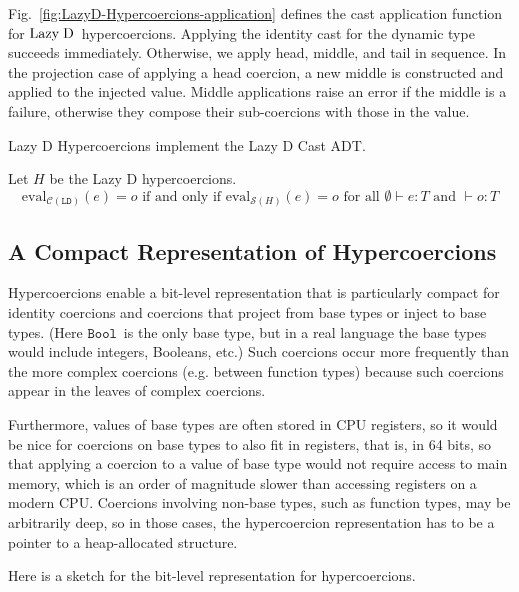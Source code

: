 \documentclass[runningheads]{llncs}
\newcommand{\LD}{\ensuremath{\text{Lazy\;D}}}
\newcommand{\CMachine}[1]{\ensuremath{\mathcal{C}(#1)}}
\newcommand{\LDMachine}{\CMachine{\BLD}}
\newcommand{\SMachine}[1]{\ensuremath{\mathcal{S}(#1)}}
\newcommand{\Pbool}[0]{\ensuremath{\mathtt{Bool}}}
\newcommand{\BLD}[0]{\ensuremath{\mathtt{LD}}}
\newcommand{\expressiontyping}[3]{\ensuremath{#1 \vdash #2 : #3}}
\newcommand{\valuetyping}[2]{\ensuremath{\vdash #1 : #2}}
\newcommand{\withmachineevalto}[3]{\ensuremath{\mathrm{eval}_{#1}(#2)=#3}}
\newcommand{\machineequiv}[2]{
	\ensuremath{
		\withmachineevalto{#1}{e}{o}	
		\text{ if and only if }
		\withmachineevalto{#2}{e}{o}
		\text{ for all }
		\expressiontyping{\emptyset}{e}{T}
		\text{ and }
		\valuetyping{o}{T}
	}}
\begin{document}
Fig.~\ref{fig:LazyD-Hypercoercions-application} defines the cast application 
function for \LD\ hypercoercions.
Applying the identity cast for the dynamic type succeeds immediately. 
Otherwise, we apply head, middle, and tail in sequence. 
%
In the projection case of applying a head coercion, a new middle is
constructed and applied to the injected value.
%
Middle applications raise an error if the middle is a failure,
otherwise they compose their sub-coercions with those in the value.

\begin{proposition} Lazy D Hypercoercions implement the Lazy D Cast ADT.
\end{proposition}
\begin{theorem} Let $H$ be the Lazy D 
hypercoercions.
\[\machineequiv{\LDMachine}{\SMachine{H}}\]
\end{theorem}


\subsection{A Compact Representation of Hypercoercions} \label{sec:hypercoercions-compact}

Hypercoercions enable a bit-level representation that is particularly
compact for identity coercions and coercions that project from base
types or inject to base types.  (Here \Pbool\ is the only base type,
but in a real language the base types would include integers,
Booleans, etc.) Such coercions occur more frequently than the more
complex coercions (e.g. between function types) because such coercions
appear in the leaves of complex coercions.

Furthermore, values of base types are often stored in CPU registers, so
it would be nice for coercions on base types to also fit in registers,
that is, in 64 bits, so that applying a coercion to a value of base
type would not require access to main memory, which is an order of
magnitude slower than accessing registers on a modern CPU.
%
Coercions involving non-base types, such as function types, may be
arbitrarily deep, so in those cases, the hypercoercion representation
has to be a pointer to a heap-allocated structure.

Here is a sketch for the bit-level representation for hypercoercions.
\end{document}
